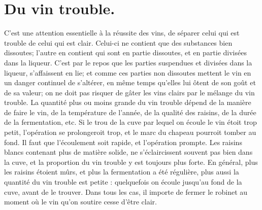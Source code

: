 \section{Du vin trouble.}
C'est une attention essentielle à la réussite des vins, de séparer celui qui est trouble de celui qui est clair. Celui-ci ne contient que des substances bien dissoutes; l'autre en contient qui sont en partie dissoutes, et en partie divisées dans la liqueur.
C'est par le repos que les parties suspendues et divisées dans la liqueur, s'affaissent en lie; et comme ces parties non dissoutes mettent le vin en un danger continuel de s'altérer, en même temps qu'elles lui ôtent de son goût et de sa valeur; on ne doit pas risquer de gâter les vins clairs par le mélange du vin trouble.
La quantité plus ou moins grande du vin trouble dépend de la manière de faire le vin, de la température de l'année, de la qualité des raisins, de la durée de la fermentation, etc.
Si le trou de la cuve par lequel on écoule\setcounter{page}{157} le vin étoit trop petit, l'opération se prolongeroit trop, et le marc du chapeau pourroit tomber au fond. Il faut que l'écoulement soit rapide, et l'opération prompte.
Les raisins blancs contenant plus de matière solide, ne s'éclaircissent souvent pas bien dans la cuve, et la proportion du vin trouble y est toujours plus forte.
En général, plus les raisins étoient mûrs, et plus la fermentation a été régulière, plus aussi la quantité du vin trouble est petite : quelquefois on écoule jusqu'au fond de la cuve, avant de le trouver.
Dans tous les cas, il importe de fermer le robinet au moment où le vin qu'on soutire cesse d'être clair.

